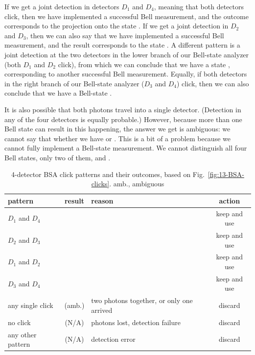 If we get a joint detection in detectors $D_1$ and $D_4$, meaning that both detectors click, then we have implemented a successful Bell measurement, and the outcome corresponds to the projection onto the state \ket{\Psi^-}. If we get a joint detection in $D_2$ and $D_3$, then we can also say that we have implemented a successful Bell measurement, and the result corresponds to the state \ket{\Psi^-}. A different pattern is a joint detection at the two detectors in the lower branch of our Bell-state analyzer (both $D_1$ and $D_2$ click), from which we can conclude that we have a state \ket{\Psi^+}, corresponding to another successful Bell measurement. Equally, if both detectors in the right branch of our Bell-state analyzer ($D_3$ and $D_4$) click, then we can also conclude that we have a Bell-state \ket{\Psi^+}.

It is also possible that both photons travel into a single detector. (Detection in any of the four detectors is equally probable.) However, because more than one Bell state can result in this happening, the answer we get is ambiguous: we cannot say that whether we have \ket{\Phi^+} or \ket{\Phi^-}.
This is a bit of a problem because we cannot fully implement a Bell-state measurement. We cannot distinguish all four Bell states, only two of them, \ket{\Psi^+} and \ket{\Psi^-}.

\begin{table}
\centering
\begin{tabular}{p{0.55in}|c|p{1.5in}|c}
pattern  & result & reason & action \\\hline
$D_1$ and $D_4$ & \ket{\Psi^-} & & keep and use \\
$D_2$ and $D_3$ & \ket{\Psi^-} & & keep and use \\
$D_1$ and $D_2$ & \ket{\Psi^+} & & keep and use \\
$D_3$ and $D_4$ & \ket{\Psi^+} & & keep and use \\
any single click & \ket{\Phi^\pm} (amb.)  & two photons together, or only one arrived & discard \\
no click & (N/A) & photons lost, detection failure & discard \\
any other pattern & (N/A) & detection error & discard
\end{tabular}
\caption{4-detector BSA click patterns and their outcomes, based on Fig.~\ref{fig:13-BSA-clicks}. amb., ambiguous}
\label{tab:bsa-clicks}
\end{table}

